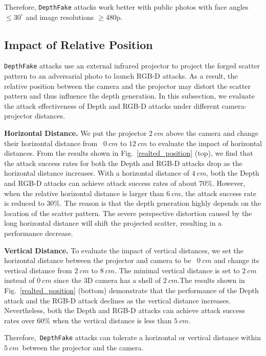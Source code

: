 Therefore, \texttt{DepthFake} attacks work better with  public photos with face angles $\leq 30^\circ$ and image resolutions $\geq$480p.


\subsection{Impact of Relative Position}

\texttt{DepthFake} attacks use an external infrared projector to project the forged scatter pattern to an adversarial photo to launch RGB-D attacks. As a result, the relative position between the camera and the projector may distort the scatter pattern and thus influence the depth generation. In this subsection, we evaluate the attack effectiveness of Depth and RGB-D attacks under different camera-projector distances.

\textbf{Horizontal Distance.} We put the projector $2~cm$ above the camera and change their horizontal distance from  $0~cm$ to $12~cm$ to evaluate the impact of horizontal distances. From the results shown in Fig.~\ref{realted_position} (top), we find that the attack success rates for both the Depth and RGB-D attacks drop as the horizontal distance increases. 
With a horizontal distance of $4~cm$, both the Depth and RGB-D attacks can achieve attack success rates of about $70\%$. However, when the relative horizontal distance is larger than $6~cm$, the attack success rate is reduced to $30\%$. The reason is that the depth generation highly depends on the location of the scatter pattern. The severe perspective distortion caused by the long horizontal distance will shift the projected scatter, resulting in a performance decrease. 

\textbf{Vertical Distance.} To evaluate the impact of vertical distances, we set the horizontal distance between the projector and camera to be  $0~cm$ and change its vertical distance from $2~cm$ to $8~cm$. The minimal vertical distance is set to $2~cm$ instead of $0~cm$ since the 3D camera has a shell of $2~cm$.The results shown in Fig.~\ref{realted_position} (bottom) demonstrate that the performance of the Depth attack and the RGB-D attack declines as the vertical distance increases. Nevertheless, both the Depth and RGB-D attacks can achieve attack success rates over  $60\%$ when the vertical distance is less than $5~cm$. 

Therefore, \texttt{DepthFake} attacks can tolerate a horizontal or vertical distance within $5~cm$ between the projector and the camera.



